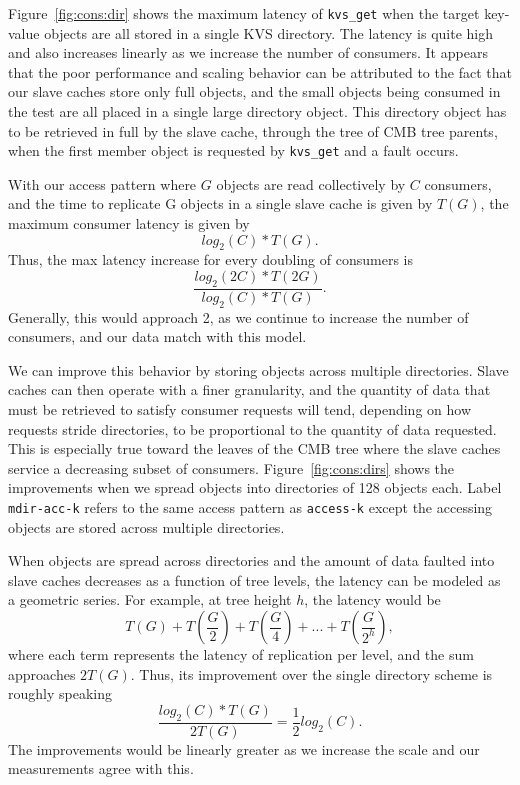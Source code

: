 Figure~\ref{fig:cons:dir} shows the maximum latency of {\tt kvs\_get}
when the target key-value objects are all stored in a single
KVS directory. The latency is quite high and also increases
linearly as we increase the number of consumers. 
It appears that the poor performance and scaling behavior 
can be attributed to the fact that our slave caches store only full
objects, and the small objects being consumed in the test are all
placed in a single large directory object.
This directory object has to be retrieved in full by the slave cache,
through the tree of CMB tree parents, when the first
member object is requested by {\tt kvs\_get} and a fault occurs.

With our access pattern where $G$ objects are read collectively by
$C$ consumers, and the time to replicate G objects in a single slave cache
is given by $T(G)$, the maximum consumer latency is given by
\begin{equation}
log_2(C) * T(G).
\end{equation}
Thus, the max latency increase for every doubling of consumers is
\begin{equation}
\frac{log_2(2C) * T(2G)}{log_2(C) * T(G)}.
\end{equation}
Generally, this would approach 2, 
as we continue to increase the number of consumers,
and our data match with this model.

We can improve this behavior by storing objects across multiple
directories. Slave caches can then operate with a finer granularity,
and the quantity of data that must be retrieved to satisfy consumer
requests will tend, depending on how requests stride directories,
to be proportional to the quantity of data requested.
This is especially true toward the leaves of the CMB tree where the
slave caches service a decreasing subset of consumers.
Figure~\ref{fig:cons:dirs} shows the improvements 
when we spread objects into directories of 128 objects each.
Label {\tt mdir-acc-k} refers to the same access pattern as {\tt access-k} 
except the accessing objects are stored across multiple directories.

\ifcomments
{}
\fi
When objects are spread across directories and the amount of data
faulted into slave caches decreases as a function of tree levels, 
the latency can be modeled as a geometric series.
For example, at tree height $h$, the latency would be 
\begin{equation}
T(G) + T(\frac{G}{2}) + T(\frac{G}{4}) + ... + T(\frac{G}{2^h}), 
\end{equation}
where each term represents the latency of replication per level,
and the sum approaches $2T(G)$. Thus, its improvement over the single
directory scheme is roughly speaking
\begin{equation}
\frac{log_2(C) * T(G)}{2 T(G)} = \frac{1}{2}log_2(C).
\end{equation}
The improvements would be linearly 
greater as we increase the scale and our measurements agree with this. 

